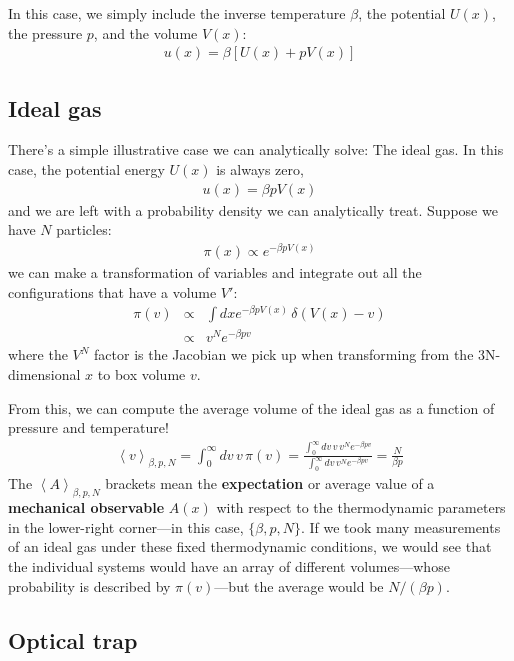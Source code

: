 \documentclass[english,course]{lecture}
\begin{document}
In this case, we simply include the inverse temperature $\beta$, the potential $U(x)$, the pressure $p$, and the volume $V(x)$:
\begin{eqnarray}
u(x) = \beta \left[ U(x) + p V(x) \right]
\end{eqnarray}

\subsection{Ideal gas}

There's a simple illustrative case we can analytically solve: The ideal gas.
In this case, the potential energy $U(x)$ is always zero, 
\begin{eqnarray}
u(x) = \beta p V(x)
\end{eqnarray}
and we are left with a probability density we can analytically treat. 
Suppose we have $N$ particles:
\begin{eqnarray}
\pi(x) \propto e^{-\beta p V(x)}
\end{eqnarray}
we can make a transformation of variables and integrate out all the configurations that have a volume $V'$:
\begin{eqnarray}
\pi(v) &\propto& \int dx e^{-\beta p V(x)} \, \delta(V(x) - v) \\
&\propto& v^N e^{-\beta p v}
\end{eqnarray}
where the $V^N$ factor is the Jacobian we pick up when transforming from the 3N-dimensional $x$ to box volume $v$.

From this, we can compute the average volume of the ideal gas as a function of pressure and temperature!
\begin{eqnarray}
\left< v \right>_{\beta, p, N} = \int_0^\infty dv \, v \, \pi(v) = \frac{\int_0^\infty dv \, v \, v^N e^{-\beta p v}}{\int_0^\infty dv \, v^N e^{-\beta p v}} = \frac{N}{\beta p}
\end{eqnarray}
The $\left< A \right>_{\beta, p, N}$ brackets mean the {\bf expectation} or average value of a {\bf mechanical observable} $A(x)$ with respect to the thermodynamic parameters in the lower-right corner---in this case, $\{\beta, p, N\}$.
If we took many measurements of an ideal gas under these fixed thermodynamic conditions, we would see that the individual systems would have an array of different volumes---whose probability is described by $\pi(v)$---but the average would be $N / (\beta p)$.

\subsection{Optical trap}
\end{document}
